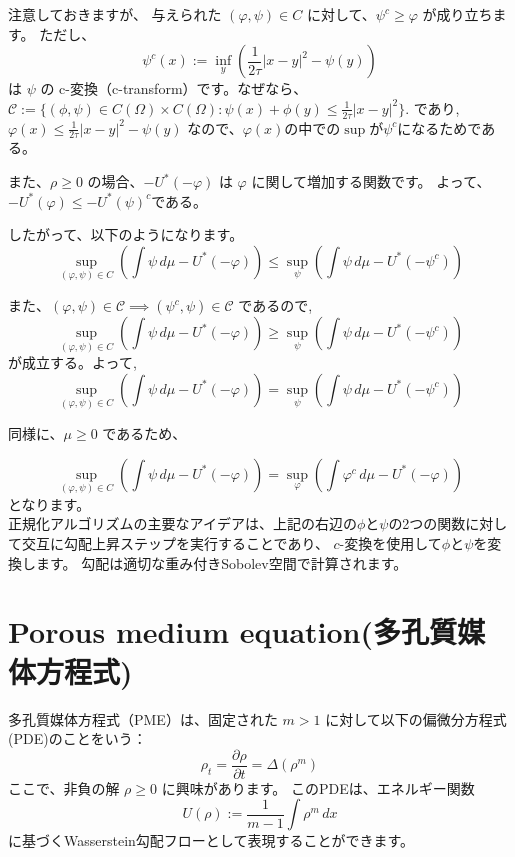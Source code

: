 \documentclass{jsarticle}
\theoremstyle{definition}
\begin{document}
注意しておきますが、
{\color{teal}
与えられた \((\varphi, \psi) \in C\) に対して、{\color{red}\(\psi^c \geq \varphi\) }が成り立ちます。
}
ただし、
\[
  \psi^c(x) := \inf_y \left( \frac{1}{2\tau}|x-y|^2 - \psi(y)\right)
\]
は \(\psi\) の c-変換（c-transform）です。なぜなら、
$
    \mathcal{C}  := \{(\phi, \psi) \in C(\Omega) \times C(\Omega) : \psi(x) + \phi(y) \leq \frac{1}{2 \tau} |x - y|^2 \}. 
$
であり,
$
  \varphi(x) \le \frac{1}{2\tau}|x-y|^2 - \psi(y)
$
なので、$\varphi(x)$の中での$\sup$が$\psi^c$になるためである。

また、\(\rho \geq 0\) の場合、\(- U^*(-\varphi)\) は \(\varphi\) に関して増加する関数です。
よって、{\color{red}$-U^*(\varphi) \le -U^*(\psi)^c$}である。


{\color{teal}したがって、以下のようになります。}
\[
\sup_{(\varphi, \psi) \in C} \left(\int \psi \, d\mu - U^*(- \varphi)\right) \le \sup_\psi \left(\int \psi \, d\mu - U^*(- \psi^c)\right)
\]

また、$(\varphi, \psi) \in \mathcal{C} \implies (\psi^c, \psi) \in \mathcal{C}$
であるので,
\[
\sup_{(\varphi, \psi) \in C} \left(\int \psi \, d\mu - U^*(- \varphi)\right) \ge \sup_\psi \left(\int \psi \, d\mu - U^*(- \psi^c)\right)
\]
が成立する。よって,
\begin{equation}
  \label{eq:psi^c}
\sup_{(\varphi, \psi) \in C} \left(\int \psi \, d\mu - U^*(- \varphi)\right) = \sup_\psi \left(\int \psi \, d\mu - U^*(- \psi^c)\right)
\end{equation}

同様に、\(\mu \geq 0\) であるため、

\begin{equation}
  \label{eq:phi^c}
  \sup_{(\varphi, \psi) \in C} \left(\int \psi \, d\mu - U^*(- \varphi)\right) = \sup_\varphi \left(\int \varphi^c \, d\mu - U^*(- \varphi)\right)
\end{equation}
となります。\\

正規化アルゴリズムの主要なアイデアは、上記の右辺の$\phi$と$\psi$の2つの関数に対して交互に勾配上昇ステップを実行することであり、
$c$-変換を使用して$\phi$と$\psi$を変換します。
勾配は適切な重み付きSobolev空間で計算されます。

\section{Porous medium equation(多孔質媒体方程式)}

多孔質媒体方程式（PME）は、固定された \(m > 1\) に対して以下の偏微分方程式(PDE)のことをいう：
\[
\rho_t = \frac{{\partial \rho}}{{\partial t}} = \Delta (\rho^m)
\]
ここで、非負の解 \(\rho \geq 0\) に興味があります。
このPDEは、エネルギー関数
\[
U(\rho) := \frac{1}{{m-1}} \int \rho^m \, dx
\]
に基づくWasserstein勾配フローとして表現することができます。
\end{document}
